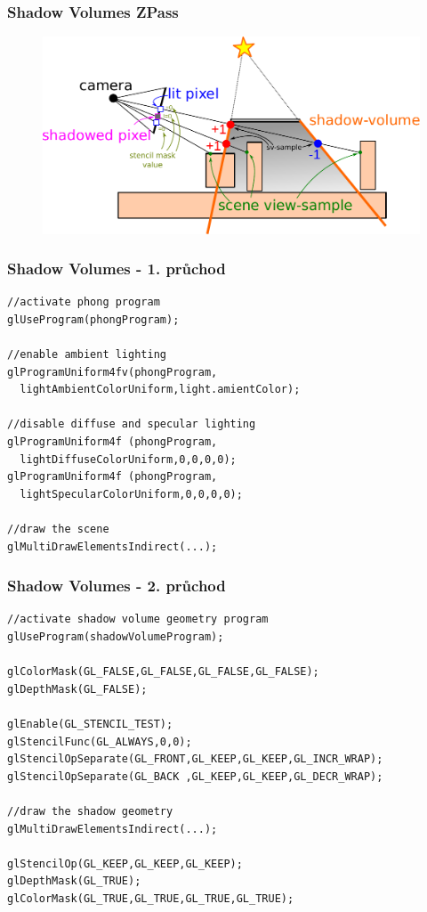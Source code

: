 \begin{frame}
  \frametitle{Shadow Volumes ZPass}
  \begin{figure}[h]
    \includegraphics[width=11.5cm,keepaspectratio]{pics/shadows/shadowVolumes/ZPass}
  \end{figure}
\end{frame}

\begin{frame}[fragile]
  \frametitle{Shadow Volumes - 1. průchod}

  \begin{verbatim}
//activate phong program
glUseProgram(phongProgram);

//enable ambient lighting
glProgramUniform4fv(phongProgram,
  lightAmbientColorUniform,light.amientColor);

//disable diffuse and specular lighting
glProgramUniform4f (phongProgram,
  lightDiffuseColorUniform,0,0,0,0);
glProgramUniform4f (phongProgram,
  lightSpecularColorUniform,0,0,0,0);

//draw the scene
glMultiDrawElementsIndirect(...);
  \end{verbatim}
\end{frame}

\begin{frame}[fragile]
  \frametitle{Shadow Volumes - 2. průchod}

  \begin{verbatim}
//activate shadow volume geometry program
glUseProgram(shadowVolumeProgram);

glColorMask(GL_FALSE,GL_FALSE,GL_FALSE,GL_FALSE);
glDepthMask(GL_FALSE);

glEnable(GL_STENCIL_TEST);
glStencilFunc(GL_ALWAYS,0,0);
glStencilOpSeparate(GL_FRONT,GL_KEEP,GL_KEEP,GL_INCR_WRAP);
glStencilOpSeparate(GL_BACK ,GL_KEEP,GL_KEEP,GL_DECR_WRAP);

//draw the shadow geometry
glMultiDrawElementsIndirect(...);

glStencilOp(GL_KEEP,GL_KEEP,GL_KEEP);
glDepthMask(GL_TRUE);
glColorMask(GL_TRUE,GL_TRUE,GL_TRUE,GL_TRUE);
  \end{verbatim}
\end{frame}

